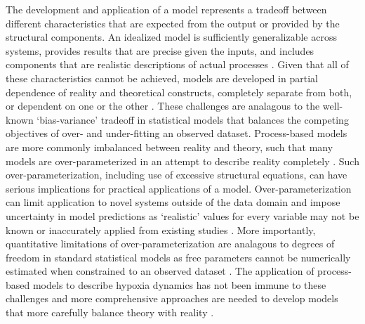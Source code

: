 \documentclass[letterpaper,12pt,oneside]{article}\usepackage[]{graphicx}\usepackage[]{color}
\begin{document}
The development and application of a model represents a tradeoff between different characteristics that are expected from the output or provided by the structural components. An idealized model is sufficiently generalizable across systems, provides results that are precise given the inputs, and includes components that are realistic descriptions of actual processes \citep{Levins66}. Given that all of these characteristics cannot be achieved, models are developed in partial dependence of reality and theoretical constructs, completely separate from both, or dependent on one or the other \citep{Morrison99,Ganju16}.  These challenges are analagous to the well-known `bias-variance' tradeoff in statistical models that balances the competing objectives of over- and under-fitting an observed dataset. Process-based models are more commonly imbalanced between reality and theory, such that many models are over-parameterized in an attempt to describe reality completely \citep{Denman03,Nossent12,Petrucci14}.  Such over-parameterization, including use of excessive structural equations, can have serious implications for practical applications of a model.  Over-parameterization can limit application to novel systems outside of the data domain and impose uncertainty in model predictions as `realistic' values for every variable may not be known or inaccurately applied from existing studies \citep{Durand02,Refsgaard07,Wade08}. More importantly, quantitative limitations of over-parameterization are analagous to degrees of freedom in standard statistical models as free parameters cannot be numerically estimated when constrained to an observed dataset \citep{Kirchner06}.  The application of process-based models to describe hypoxia dynamics has not been immune to these challenges and more comprehensive approaches are needed to develop models that more carefully balance theory with reality \citep[e.g.,][]{Snowling01}.  
\end{document}

